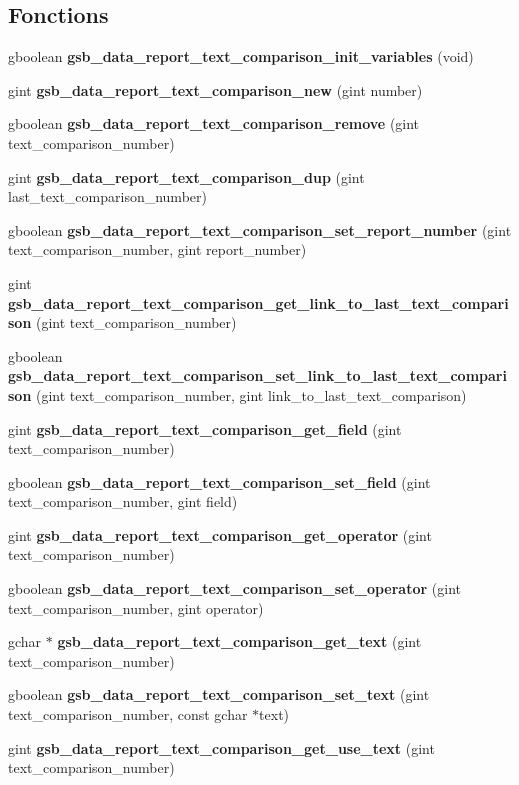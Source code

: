\subsection*{Fonctions}
\begin{DoxyCompactItemize}
\item 
gboolean {\bf gsb\_\-data\_\-report\_\-text\_\-comparison\_\-init\_\-variables} (void)
\item 
gint {\bf gsb\_\-data\_\-report\_\-text\_\-comparison\_\-new} (gint number)
\item 
gboolean {\bf gsb\_\-data\_\-report\_\-text\_\-comparison\_\-remove} (gint text\_\-comparison\_\-number)
\item 
gint {\bf gsb\_\-data\_\-report\_\-text\_\-comparison\_\-dup} (gint last\_\-text\_\-comparison\_\-number)
\item 
gboolean {\bf gsb\_\-data\_\-report\_\-text\_\-comparison\_\-set\_\-report\_\-number} (gint text\_\-comparison\_\-number, gint report\_\-number)
\item 
gint {\bf gsb\_\-data\_\-report\_\-text\_\-comparison\_\-get\_\-link\_\-to\_\-last\_\-text\_\-comparison} (gint text\_\-comparison\_\-number)
\item 
gboolean {\bf gsb\_\-data\_\-report\_\-text\_\-comparison\_\-set\_\-link\_\-to\_\-last\_\-text\_\-comparison} (gint text\_\-comparison\_\-number, gint link\_\-to\_\-last\_\-text\_\-comparison)
\item 
gint {\bf gsb\_\-data\_\-report\_\-text\_\-comparison\_\-get\_\-field} (gint text\_\-comparison\_\-number)
\item 
gboolean {\bf gsb\_\-data\_\-report\_\-text\_\-comparison\_\-set\_\-field} (gint text\_\-comparison\_\-number, gint field)
\item 
gint {\bf gsb\_\-data\_\-report\_\-text\_\-comparison\_\-get\_\-operator} (gint text\_\-comparison\_\-number)
\item 
gboolean {\bf gsb\_\-data\_\-report\_\-text\_\-comparison\_\-set\_\-operator} (gint text\_\-comparison\_\-number, gint operator)
\item 
gchar $\ast$ {\bf gsb\_\-data\_\-report\_\-text\_\-comparison\_\-get\_\-text} (gint text\_\-comparison\_\-number)
\item 
gboolean {\bf gsb\_\-data\_\-report\_\-text\_\-comparison\_\-set\_\-text} (gint text\_\-comparison\_\-number, const gchar $\ast$text)
\item 
gint {\bf gsb\_\-data\_\-report\_\-text\_\-comparison\_\-get\_\-use\_\-text} (gint text\_\-comparison\_\-number)
\item 

\end{DoxyCompactItemize}
